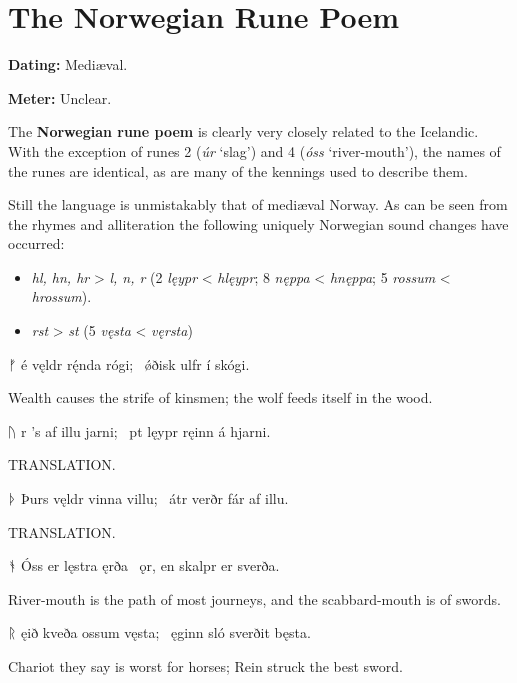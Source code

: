 \section{The Norwegian Rune Poem}\chapterStart{}

\begin{flushright}%
\textbf{Dating:} Mediæval.%

\textbf{Meter:} Unclear.
\end{flushright}%

The \textbf{Norwegian rune poem} is clearly very closely related to the Icelandic.  With the exception of runes 2 (\emph{úr} ‘slag’) and 4 (\emph{óss} ‘river-mouth’), the names of the runes are identical, as are many of the kennings used to describe them.

Still the language is unmistakably that of mediæval Norway.  As can be seen from the rhymes and alliteration the following uniquely Norwegian sound changes have occurred:
\begin{itemize}
  \item \emph{hl, hn, hr} > \emph{l, n, r} (2 \emph{lęypr} < \emph{hlęypr}; 8 \emph{nęppa} < \emph{hnęppa}; 5 \emph{rossum} < \emph{hrossum}).
  \item \emph{rst} > \emph{st} (5 \emph{vęsta} < \emph{vęrsta})
\end{itemize}

\sectionline

\bvg\bva%
ᚠ é vęldr rę́nda rógi; \hld\ ǿðisk ulfr í skógi.\eva

\bvb Wealth causes the strife of kinsmen; the wolf feeds itself in the wood.\evb\evg


\bvg\bva%
ᚢ r ’s af illu jarni; \hld\ pt lęypr ręinn á hjarni.\eva

\bvb TRANSLATION.\evb\evg


\bvg\bva%
ᚦ Þurs vęldr vinna villu; \hld\ átr verðr fár af illu.\eva

\bvb TRANSLATION.\evb\evg


\bvg\bva%
ᚬ Óss er lęstra ęrða \hld\ ǫr, en skalpr er sverða.\eva

\bvb River-mouth is the path of most journeys, and the scabbard-mouth is of swords.\evb\evg


\bvg\bva%
ᚱ ęið kveða ossum vęsta; \hld\ ęginn sló sverðit bęsta.\eva

\bvb Chariot they say is worst for horses; Rein struck the best sword.\evb\evg


